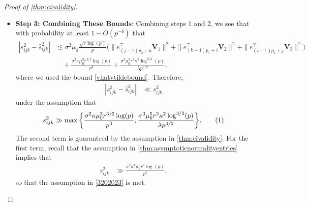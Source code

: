 \documentclass[10pt]{article}
\newcommand{\0}{{\mathbf{0}}}
\newcommand{\1}{{\mathbf{1}}}
\renewcommand{\t}{^{\top}}
\renewcommand{\hat}{\widehat}
\newcommand\numberthis{\addtocounter{equation}{1}\tag{\theequation}}
\renewcommand{\hat}{\widehat}
\begin{document}
\begin{proof}[Proof of \cref{thm:civalidity}]
\begin{itemize}
\begin{align*}
    &\ll s^2_{ijk},
\end{align*}
since $s^2_{ijk}$ satisfies the lower bound
\begin{align*}
    s^2_{ijk} \geq \sigma_{\min}^2 \bigg( \| e_{(j-1)p_3 + k}\t \mathbf{V}_1 \|^2 + \| e_{(k-1)p_1 + i}\t \mathbf{V}_2 \|^2 + \| e_{(i-1)p_2 + j}\t \mathbf{V}_3 \|^2 \bigg),
\end{align*}
and $\sigma/\sigma_{\min} = O(1)$ by assumption.  
\item \textbf{Step 3: Combining These Bounds}: 
Combining steps 1 and 2, we see that with probability at least $1 - O(p^{-6})$ that
\begin{align*}
    |s^2_{ijk} - \hat s^2_{ijk} | &\lesssim \sigma^2 \mu_0 \frac{\sqrt{r\log(p)}}{p} \bigg( \| e_{(j-1)p_3 + k}\t \mathbf{V}_1 \|^2 + \| e_{(k-1)p_1 + i}\t \mathbf{V}_2 \|^2 + \| e_{(i-1)p_2 + j}\t \mathbf{V}_3 \|^2 \bigg) \\
    &\quad + \frac{\sigma^2 \kappa \mu_0^3 r^{3/2} \log(p)}{p^3} + \frac{\sigma^3 \mu_0^5 r^3 \kappa^2 \log^{3/2}(p)}{\lambda p^{3/2}},
\end{align*}
where we used the bound \eqref{vhatvtildebound}.  Therefore,
\begin{align*}
    |s^2_{ijk} - \hat s^2_{ijk} | &\ll s^2_{ijk}
\end{align*}
under the assumption that
\begin{align*}
    s^2_{ijk} \gg \max\bigg\{  \frac{\sigma^{2} \kappa \mu_{0}^{3} r^{3 / 2} \log (p)}{p^{3}},\frac{\sigma^{3} \mu_{0}^{5} r^{3} \kappa^{2} \log ^{3 / 2}(p)}{\lambda p^{3 / 2}} \bigg\}. \numberthis \label{3202023}
\end{align*}
The second term is guaranteed by the assumption in \cref{thm:civalidity}.  For the first term, recall that the assumption in \cref{thm:asymptoticnormalityentries} implies that
\begin{align*}
    s_{ijk}^2 &\gg \frac{\sigma^2 \kappa^4 \mu_0^6 r^4 \log(p)}{p^3},
\end{align*}
so that the assumption in \eqref{3202023} is met.  


\end{itemize}
\end{proof}
\end{document}
